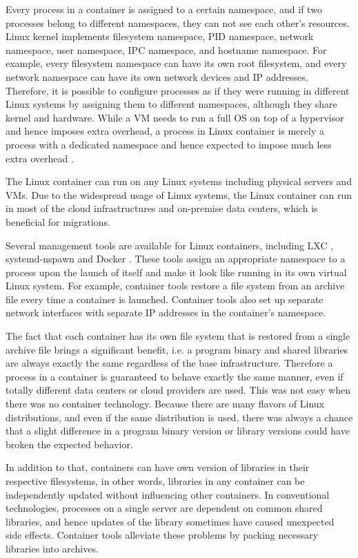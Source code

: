 Every process in a container is assigned to a certain namespace, and if two processes belong to different namespaces, they can not see each other's resources. 
Linux kernel implements filesystem namespace, PID namespace, network namespace, user namespace, IPC namespace, and hostname namespace. 
For example, every filesystem namespace can have its own root filesystem, and every network namespace can have its own network devices and IP addresses.
Therefore, it is possible to configure processes as if they were running in different Linux systems by assigning them to different namespaces, although they share kernel and hardware.
While a VM needs to run a full OS on top of a hypervisor and hence imposes extra overhead, a process in Linux container is merely a process with a dedicated namespace and hence expected to impose much less extra overhead \cite{felter2015updated}.

The Linux container can run on any Linux systems including physical servers and VMs.
Due to the widespread usage of Linux systems, the Linux container can run in most of the cloud infrastructures and on-premise data centers, which is beneficial for migrations.

Several management tools are available for Linux containers, including LXC \cite{noronha2018performance}, systemd-nspawn \cite{jedge2013} and Docker \cite{merkel2014docker}.
These tools assign an appropriate namespace to a process upon the launch of itself and make it look like running in its own virtual Linux system.
For example, container tools restore a file system from an archive file every time a container is launched. 
Container tools also set up separate network interfaces with separate IP addresses in the container's namespace.

The fact that each container has its own file system that is restored from a single archive file brings a significant benefit, i.e. a program binary and shared libraries are always exactly the same regardless of the base infrastructure.
Therefore a process in a container is guaranteed to behave exactly the same manner, even if totally different data centers or cloud providers are used.
This was not easy when there was no container technology.
Because there are many flavors of Linux distributions, and even if the same distribution is used, there was always a chance that a slight difference in a program binary version or library versions could have broken the expected behavior.

In addition to that, containers can have own version of libraries in their respective filesystems, in other words, libraries in any container can be independently updated without influencing other containers.
In conventional technologies, processes on a single server are dependent on common shared libraries, and hence updates of the library sometimes have caused unexpected side effects.
Container tools alleviate these problems by packing necessary libraries into archives. 

